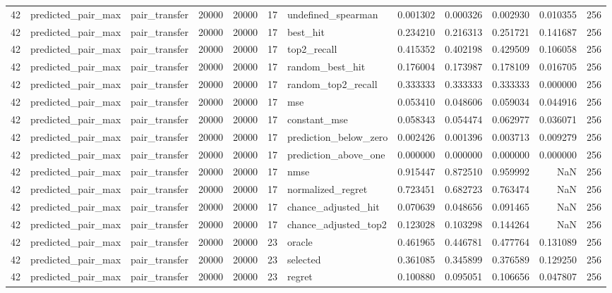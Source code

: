 \begin{tabular}{rllrrrlrrrrr}
42 & predicted_pair_max & pair_transfer & 20000 & 20000 & 17 & undefined_spearman & 0.001302 & 0.000326 & 0.002930 & 0.010355 & 256 \\
42 & predicted_pair_max & pair_transfer & 20000 & 20000 & 17 & best_hit & 0.234210 & 0.216313 & 0.251721 & 0.141687 & 256 \\
42 & predicted_pair_max & pair_transfer & 20000 & 20000 & 17 & top2_recall & 0.415352 & 0.402198 & 0.429509 & 0.106058 & 256 \\
42 & predicted_pair_max & pair_transfer & 20000 & 20000 & 17 & random_best_hit & 0.176004 & 0.173987 & 0.178109 & 0.016705 & 256 \\
42 & predicted_pair_max & pair_transfer & 20000 & 20000 & 17 & random_top2_recall & 0.333333 & 0.333333 & 0.333333 & 0.000000 & 256 \\
42 & predicted_pair_max & pair_transfer & 20000 & 20000 & 17 & mse & 0.053410 & 0.048606 & 0.059034 & 0.044916 & 256 \\
42 & predicted_pair_max & pair_transfer & 20000 & 20000 & 17 & constant_mse & 0.058343 & 0.054474 & 0.062977 & 0.036071 & 256 \\
42 & predicted_pair_max & pair_transfer & 20000 & 20000 & 17 & prediction_below_zero & 0.002426 & 0.001396 & 0.003713 & 0.009279 & 256 \\
42 & predicted_pair_max & pair_transfer & 20000 & 20000 & 17 & prediction_above_one & 0.000000 & 0.000000 & 0.000000 & 0.000000 & 256 \\
42 & predicted_pair_max & pair_transfer & 20000 & 20000 & 17 & nmse & 0.915447 & 0.872510 & 0.959992 & NaN & 256 \\
42 & predicted_pair_max & pair_transfer & 20000 & 20000 & 17 & normalized_regret & 0.723451 & 0.682723 & 0.763474 & NaN & 256 \\
42 & predicted_pair_max & pair_transfer & 20000 & 20000 & 17 & chance_adjusted_hit & 0.070639 & 0.048656 & 0.091465 & NaN & 256 \\
42 & predicted_pair_max & pair_transfer & 20000 & 20000 & 17 & chance_adjusted_top2 & 0.123028 & 0.103298 & 0.144264 & NaN & 256 \\
42 & predicted_pair_max & pair_transfer & 20000 & 20000 & 23 & oracle & 0.461965 & 0.446781 & 0.477764 & 0.131089 & 256 \\
42 & predicted_pair_max & pair_transfer & 20000 & 20000 & 23 & selected & 0.361085 & 0.345899 & 0.376589 & 0.129250 & 256 \\
42 & predicted_pair_max & pair_transfer & 20000 & 20000 & 23 & regret & 0.100880 & 0.095051 & 0.106656 & 0.047807 & 256 \\

\end{tabular}

